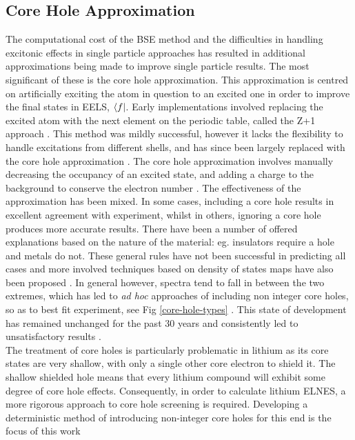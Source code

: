 \subsection{Core Hole Approximation} \label{Core Hole Approximation}
The computational cost of the BSE method and the difficulties in handling excitonic effects in  single particle approaches has resulted in additional approximations being made to improve single particle results.  The most significant of these is the core hole approximation.  This approximation is centred on artificially exciting the atom in question to an excited one in order to improve the final states in EELS, $\bra{f}$.  Early implementations involved replacing the excited atom with the next element on the periodic table, called the Z+1 approach \cite{lee_new_1977}.  This method was mildly successful, however it lacks the flexibility to handle excitations from different shells, and has since been largely replaced with the core hole approximation \cite{hebert_practical_2007}.  The core hole approximation involves manually decreasing the occupancy of an excited state, and adding a charge to the background to conserve the electron number \cite{wien2k}. The effectiveness of the approximation has been mixed.  In some cases, including a core hole results in excellent agreement with experiment, whilst in others, ignoring a core hole produces more accurate results.   There have been a number of offered explanations based on the nature of the material: eg. insulators require a hole and metals do not.  These general rules have not been successful in predicting all cases and more involved techniques based on density of states maps have also been proposed \cite{mauchamp_core-hole_2009}.  In general however, spectra tend to fall in between the two extremes, which has led to \textit{ad hoc} approaches of including non integer core holes, so as to best fit experiment, see Fig \ref{core-hole-types} \cite{hebert_practical_2007, luitz_partial_2001, hebert_improvement_2003, slater_energy_1964}. This state of development has remained unchanged for the past 30 years and consistently led to unsatisfactory results \cite{ brydson_further_1988, hardcastle_robust_2017,bad_hole1,bad_hole2, bad_hole3, bad_hole4, bad_hole5, bad_hole6, bad_hole7, bad_hole8,bad_hole9, bad_hole10}. \\
The treatment of core holes is particularly problematic in lithium as its core states are very shallow, with only a single other core electron to shield it.  The shallow shielded hole means that every lithium compound will exhibit some degree of core hole effects.  Consequently, in order to  calculate lithium ELNES, a more rigorous approach to core hole screening is required.  Developing a deterministic method of introducing non-integer core holes for this end is the focus of this work


